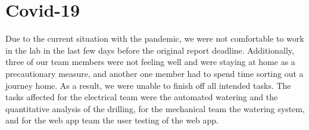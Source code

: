 \documentclass{article}
\begin{document}
\section{Covid-19}\label{sec:covid}
\vspace{-2mm}

Due to the current situation with the pandemic, we were not comfortable to work in the lab in the last few days before the original report deadline. Additionally, three of our team members were not feeling well and were staying at home as a precautionary measure, and another one member had to spend time sorting out a journey home. As a result, we were unable to finish off all intended tasks. The tasks affected for the electrical team were the automated watering and the quantitative analysis of the drilling, for the mechanical team the watering system, and for the web app team the user testing of the web app.






\end{document}
